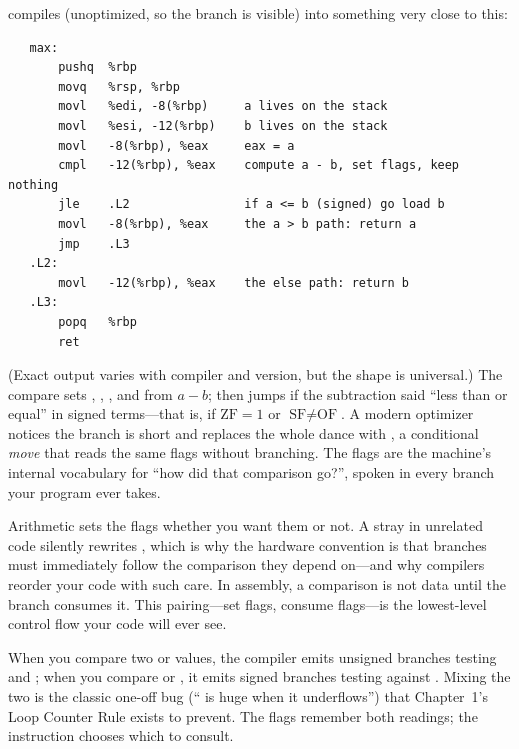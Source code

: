 compiles (unoptimized, so the branch is visible) into something very
close to this:

\begin{verbatim}
   max:
       pushq  %rbp
       movq   %rsp, %rbp
       movl   %edi, -8(%rbp)     a lives on the stack
       movl   %esi, -12(%rbp)    b lives on the stack
       movl   -8(%rbp), %eax     eax = a
       cmpl   -12(%rbp), %eax    compute a - b, set flags, keep nothing
       jle    .L2                if a <= b (signed) go load b
       movl   -8(%rbp), %eax     the a > b path: return a
       jmp    .L3
   .L2:
       movl   -12(%rbp), %eax    the else path: return b
   .L3:
       popq   %rbp
       ret
\end{verbatim}

(Exact output varies with compiler and version, but the shape is
universal.) The compare sets , , , and
 from $a - b$;  then jumps if the subtraction said
``less than or equal'' in signed terms---that is, if $\text{ZF}=1$ or
$\text{SF} \ne \text{OF}$. A modern optimizer notices the branch is
short and replaces the whole dance with , a conditional
\emph{move} that reads the same flags without branching. The flags
are the machine's internal vocabulary for ``how did that
comparison go?'', spoken in every branch your program ever takes.

\begin{insight}
Arithmetic sets the flags whether you want them or not. A stray
 in unrelated code silently rewrites , which is
why the hardware convention is that branches must immediately follow
the comparison they depend on---and why compilers reorder your code
with such care. In assembly, a comparison is not data until the
branch consumes it. This pairing---set flags, consume flags---is the
lowest-level control flow your code will ever see.
\end{insight}

\begin{ruleofthumb}
When you compare two  or  values, the
compiler emits unsigned branches testing  and ;
when you compare  or , it emits signed branches
testing  against . Mixing the two is the classic
one-off bug (`` is huge when it underflows'') that
Chapter~1's Loop Counter Rule exists to prevent. The flags remember
both readings; the instruction chooses which to consult.
\end{ruleofthumb}

